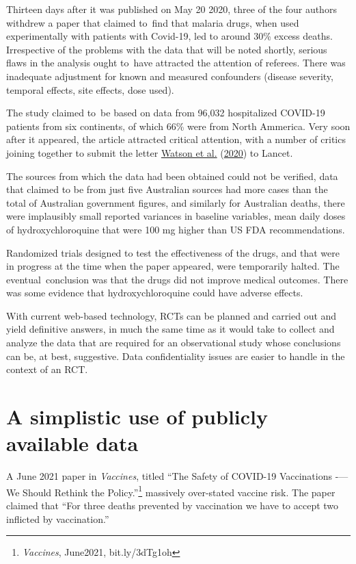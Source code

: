 \documentclass[
  10pt,
  b5paper]{book}
\begin{document}
Thirteen days after it was published on May 20 2020, three of the
four authors withdrew a paper that claimed to~find that malaria drugs,
when used experimentally with patients with Covid-19, led to around
30\% excess deaths. Irrespective of the problems with the data that
will be noted shortly, serious flaws in the analysis ought to~have
attracted the attention of referees. There was inadequate
adjustment for known and measured confounders (disease severity,
temporal effects, site effects, dose used).

The study claimed to~be based on data from 96,032
hospitalized COVID-19 patients from six continents, of which 66\%
were from North Ammerica. Very soon after it appeared, the article
attracted critical attention, with a number of critics joining
together to submit the letter \protect\hyperlink{ref-watson2020open}{Watson et al.} (\protect\hyperlink{ref-watson2020open}{2020}) to Lancet.

The sources from which the data had been obtained could not be verified,
data that claimed to be from just five Australian sources had more
cases than the total of Australian government figures, and similarly
for Australian deaths, there were implausibly small reported variances
in baseline variables, mean daily doses of hydroxychloroquine that were
100 mg higher than US FDA recommendations.

Randomized trials designed to test the effectiveness of the drugs,
and that were in progress at the time when the paper appeared,
were temporarily halted. The eventual~conclusion was that the
drugs did not improve medical outcomes. There was some evidence
that hydroxychloroquine could have adverse effects.

With current web-based technology, RCTs can be planned and carried out and yield definitive answers, in much the same time as it would take to collect and analyze the data that are required for an observational study whose conclusions can be, at best, suggestive. Data confidentiality issues are easier to handle in the context of an RCT.

\hypertarget{a-simplistic-use-of-publicly-available-data}{%
\section{A simplistic use of publicly available data}\label{a-simplistic-use-of-publicly-available-data}}

A June 2021 paper in \emph{Vaccines}, titled
``The Safety of COVID-19 Vaccinations -\/--- We Should Rethink the Policy.''\footnote{\emph{Vaccines}, June2021, bit.ly/3dTg1oh}
massively over-stated vaccine risk. The paper claimed that
``For three deaths prevented by vaccination we have to accept
two inflicted by vaccination.''
\end{document}
